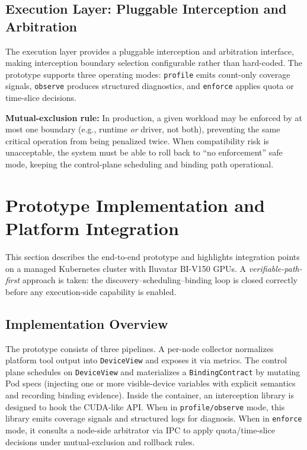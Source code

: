 \documentclass[runningheads,a4paper]{llncs}
\begin{document}
\subsection{Execution Layer: Pluggable Interception and Arbitration}

The execution layer provides a pluggable interception and arbitration
interface, making interception boundary selection configurable rather than hard-coded. The prototype supports three operating modes: \texttt{profile} emits count-only coverage signals, \texttt{observe} produces structured diagnostics, and \texttt{enforce} applies quota or time-slice decisions.

\noindent\textbf{Mutual-exclusion rule:} In production, a given workload
may be enforced by at most one boundary (e.g., runtime \emph{or} driver,
not both), preventing the same critical operation from being penalized
twice. When compatibility risk is unacceptable, the system must be able to
roll back to ``no enforcement'' safe mode, keeping the control-plane
scheduling and binding path operational.

\section{Prototype Implementation and Platform Integration}
\label{sec:impl}

This section describes the end-to-end prototype and highlights integration
points on a managed Kubernetes cluster with Iluvatar BI-V150 GPUs. A \emph{verifiable-path-first} approach is taken: the
discovery--scheduling--binding loop is closed correctly before any
execution-side capability is enabled.

\subsection{Implementation Overview}

The prototype consists of three pipelines. A per-node collector normalizes
platform tool output into \texttt{DeviceView} and exposes it via metrics.
The control plane schedules on \texttt{DeviceView} and materializes a
\texttt{BindingContract} by mutating Pod specs (injecting one or more
visible-device variables with explicit semantics and recording binding
evidence). Inside the container, an interception library is designed to hook the
CUDA-like API. When in \texttt{profile/observe} mode, this library emits coverage signals and
structured logs for diagnosis. When in \texttt{enforce} mode, it consults a node-side
arbitrator via IPC to apply quota/time-slice decisions under
mutual-exclusion and rollback rules.
\end{document}
